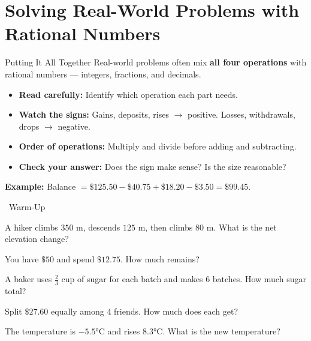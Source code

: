 \section{Solving Real-World Problems with Rational Numbers}

\begin{quickReview}{Putting It All Together}
Real-world problems often mix \textbf{all four operations} with rational numbers — integers, fractions, and decimals.

\begin{itemize}[leftmargin=*]
    \item \textbf{Read carefully:} Identify which operation each part needs.
    \item \textbf{Watch the signs:} Gains, deposits, rises $\to$ positive. Losses, withdrawals, drops $\to$ negative.
    \item \textbf{Order of operations:} Multiply and divide before adding and subtracting.
    \item \textbf{Check your answer:} Does the sign make sense? Is the size reasonable?
\end{itemize}

\medskip
\textbf{Example:} Balance $= \$125.50 - \$40.75 + \$18.20 - \$3.50 = \$99.45$.
\end{quickReview}

\begin{practiceBox}[funGreen]{\faSun~Warm-Up}


\prob A hiker climbs $350$ m, descends $125$ m, then climbs $80$ m. What is the net elevation change? \answerBlank[3cm]

\prob You have $\$50$ and spend $\$12.75$. How much remains? \answerBlank[3cm]

\prob A baker uses $\frac{2}{3}$ cup of sugar for each batch and makes $6$ batches. How much sugar total? \answerBlank[3cm]

\prob Split $\$27.60$ equally among $4$ friends. How much does each get? \answerBlank[3cm]

\prob The temperature is $-5.5°$C and rises $8.3°$C. What is the new temperature? \answerBlank[3cm]

\end{practiceBox}


